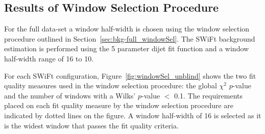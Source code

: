 \vspace{0.5em}
\subsection{Results of Window Selection Procedure}
\label{sec:bkg-full_windowSelResults}

For the full \lm{} data-set a window half-width is chosen using the window selection procedure outlined in Section~\ref{sec:bkg-full_windowSel}.
The SWiFt background estimation is performed using the 5 parameter dijet fit function and a window half-width range of 16 to 10.

For each SWiFt configuration, Figure~\ref{fig:windowSel_unblind} shows the two fit quality measures used in the window selection procedure:
the global $\chi^2$ $p$-value and the number of windows with a Wilks' $p$-value $<$ 0.1.
The requirements placed on each fit quality measure by the window selection procedure are indicated by dotted lines on the figure.
A window half-width of 16 is selected as it is the widest window that passes the fit quality criteria.

